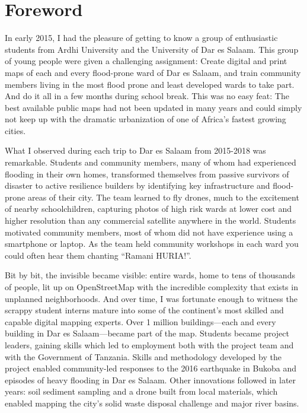 \documentclass[a4paper,12pt,twoside]{article}
\begin{document}
\thispagestyle{empty}
\clearpage

\newpage
\setlength{\parskip}{0.4em}
\section{Foreword}
\begin{multicols}{2}
In early 2015, I had the pleasure of getting to know a group of enthusiastic students from Ardhi University and the University of Dar es Salaam. This group of young people were given a challenging assignment: Create digital and print maps of each and every flood-prone ward of Dar es Salaam, and train community members living in the most flood prone and least developed wards to take part. And do it all in a few months during school break. This was no easy feat: The best available public maps had not been updated in many years and could simply not keep up with the dramatic urbanization of one of Africa’s fastest growing cities.
 
What I observed during each trip to Dar es Salaam from 2015-2018 was remarkable. Students and community members, many of whom had experienced flooding in their own homes, transformed themselves from passive survivors of disaster to active resilience builders by identifying key infrastructure and flood-prone areas of their city. The team learned to fly drones, much to the excitement of nearby schoolchildren, capturing photos of high risk wards at lower cost and higher resolution than any commercial satellite anywhere in the world. Students motivated community members, most of whom did not have experience using a smartphone or laptop. As the team held community workshops in each ward you could often hear them chanting “Ramani HURIA!”.
 
Bit by bit, the invisible became visible: entire wards, home to tens of thousands of people, lit up on OpenStreetMap with the incredible complexity that exists in unplanned neighborhoods. And over time, I was fortunate enough to witness the scrappy student interns mature into some of the continent’s most skilled and capable digital mapping experts. Over 1 million buildings---each and every building in Dar es Salaam---became part of the map. Students became project leaders, gaining skills which led to employment both with the project team and with the Government of Tanzania. Skills and methodology developed by the project enabled community-led responses to the 2016 earthquake in Bukoba and episodes of heavy flooding in Dar es Salaam. Other innovations followed in later years: soil sediment sampling and a drone built from local materials, which enabled mapping the city’s solid waste disposal challenge and major river basins.
 

\end{multicols}
\end{document}
